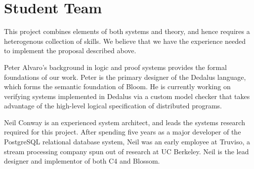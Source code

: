 \section{Student Team}
This project combines elements of both systems and theory, and hence requires a
heterogenous collection of skills. We believe that we have the experience needed
to implement the proposal described above.

Peter Alvaro's background in logic and proof systems provides the formal
foundations of our work.  Peter is the primary designer of the Dedalus language,
which forms the semantic foundation of Bloom.  He is currently working on
verifying systems implemented in Dedalus via a custom model checker that
takes advantage of the high-level logical specification of distributed programs.

Neil Conway is an experienced system architect, and leads the systems research
required for this project. After spending five years as a major developer of the
PostgreSQL relational database system, Neil was an early employee at Truviso, a
stream processing company spun out of research at UC Berkeley. Neil is the lead
designer and implementor of both C4 and Blossom.
